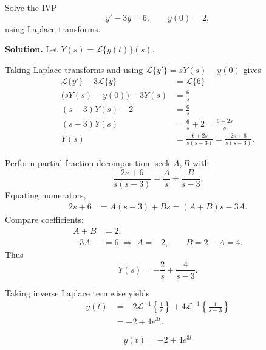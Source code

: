     \begin{example}
      Solve the IVP
      \[
      y' - 3y = 6,\qquad y(0)=2,
      \]
      using Laplace transforms.

      \textbf{Solution.} Let $Y(s)=\mathcal{L}\{y(t)\}(s)$.
      
      Taking Laplace transforms and using $\mathcal{L}\{y'\}=sY(s)-y(0)$ gives
      \begin{align*}
      \mathcal{L}\{y'\}-3\mathcal{L}\{y\} &= \mathcal{L}\{6\} \\
      \big(sY(s)-y(0)\big) - 3Y(s) &= \frac{6}{s} \\
      (s-3)Y(s) - 2 &= \frac{6}{s} \\
      (s-3)Y(s) &= \frac{6}{s} + 2 = \frac{6+2s}{s} \\
      Y(s) &= \frac{6+2s}{s(s-3)} = \frac{2s+6}{s(s-3)}.
      \end{align*}

      Perform partial fraction decomposition: seek $A,B$ with
      \[
      \frac{2s+6}{s(s-3)}=\frac{A}{s}+\frac{B}{s-3}.
      \]
      Equating numerators,
      \begin{align*}
      2s+6 &= A(s-3)+Bs = (A+B)s - 3A.
      \end{align*}
      Compare coefficients:
      \begin{align*}
      A+B &= 2,\\
      -3A &= 6 \;\Rightarrow\; A = -2,\qquad B = 2 - A = 4.
      \end{align*}
      Thus
      \[
      Y(s) = -\frac{2}{s} + \frac{4}{s-3}.
      \]

      Taking inverse Laplace termwise yields
      \begin{align*}
      y(t) &= -2\mathcal{L}^{-1}\!\left\{\frac{1}{s}\right\} + 4\mathcal{L}^{-1}\!\left\{\frac{1}{s-3}\right\} \\
          &= -2 + 4e^{3t}.
      \end{align*}

      \[
      \boxed{\,y(t) = -2 + 4e^{3t}\,}
      \]
    \end{example}


